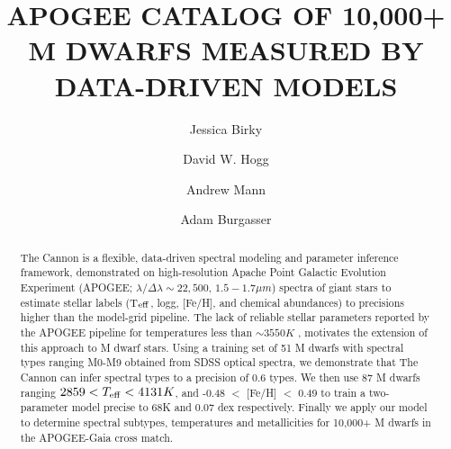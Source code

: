 \documentclass[modern]{aastex62}
\begin{document}
\title{APOGEE CATALOG OF 10,000+ M DWARFS MEASURED BY DATA-DRIVEN MODELS}


\author[0000-0002-7961-6881]{Jessica Birky}

\author[0000-0003-2866-9403]{David W. Hogg}

\author[0000-0003-3654-1602]{Andrew Mann}

\author[0000-0002-6523-9536]{Adam Burgasser}

\begin{abstract}

The Cannon \citep{Ness:2015} is a flexible, data-driven spectral modeling and parameter inference framework, demonstrated on high-resolution Apache Point Galactic Evolution Experiment (APOGEE; $\lambda/\Delta\lambda\sim22,500$, $1.5-1.7 \mu m$) spectra of giant stars to estimate stellar labels (T$_{\rm eff}$, logg, [Fe/H], and chemical abundances) to precisions higher than the model-grid pipeline. The lack of reliable stellar parameters reported by the APOGEE pipeline for temperatures less than $\sim3550K$ \citep{Schmidt:2016}, motivates the extension of this approach to M dwarf stars. Using a training set of 51 M dwarfs with spectral types ranging M0-M9 obtained from SDSS optical spectra, we demonstrate that The Cannon can infer spectral types to a precision of 0.6 types. We then use 87 M dwarfs ranging $2859 < T_{\rm eff} < 4131K$, and -0.48 $<$ [Fe/H] $<$ 0.49 to train a two-parameter model precise to 68K and 0.07 dex respectively. Finally we apply our model to determine spectral subtypes, temperatures and metallicities for 10,000+ M dwarfs in the APOGEE-Gaia cross match.

\end{abstract}
\end{document}
